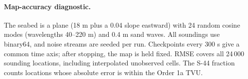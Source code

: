 \paragraph{Map-accuracy diagnostic.} The seabed is a plane (18 m plus a 0.04 slope eastward) with 24 random cosine modes (wavelengths 40--220 m) and 0.4 m sand waves. All soundings use binary64, and noise streams are seeded per run. Checkpoints every 300 s give a common time axis; after stopping, the map is held fixed. RMSE covers all 24\,000 sounding locations, including interpolated unobserved cells. The S-44 fraction counts locations whose absolute error is within the Order 1a TVU.
\begin{table}[htbp]\centering\scriptsize
\caption{Synthetic map accuracy per policy (core: 180 frozen runs each; extension: 180 runs each). The last column counts runs reaching 0.5 m RMSE before timeout.}

\end{table}
